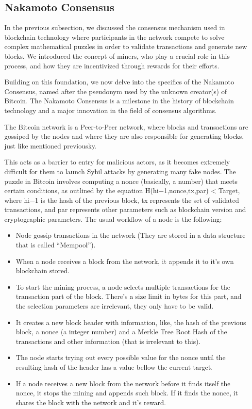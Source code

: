 \subsection*{Nakamoto Consensus}
In the previous subsection, we discussed the consensus mechanism used in blockchain technology where participants in the network compete to solve complex mathematical puzzles in order to validate transactions and generate new blocks.
We introduced the concept of miners, who play a crucial role in this process, and how they are incentivized through rewards for their efforts.

Building on this foundation, we now delve into the specifics of the Nakamoto Consensus, named after the pseudonym used by the unknown creator(s) of Bitcoin. The Nakamoto Consensus is a milestone in the history of blockchain technology and a major innovation in the field of consensus algorithms.

The Bitcoin network is a Peer-to-Peer network, where blocks and transactions are gossiped by the nodes and where they are also responsible for generating blocks, just like mentioned previousky.

This acts as a barrier to entry for malicious actors, as it becomes extremely difficult for them to launch Sybil attacks by generating many fake nodes.
The puzzle in Bitcoin involves computing a nonce (basically, a number) that meets certain conditions, as outlined by the equation H(hi−1,nonce,tx,par) < Target, where hi−1 is the hash of the previous block, tx represents the set of validated transactions, and par represents other parameters such as blockchain version and cryptographic parameters.
The usual workflow of a node is the following:
\begin{itemize}
    \item Node gossip transactions in the network (They are stored in a data structure that is called ``Mempool'').
    \item When a node receives a block from the network, it appends it to it's own blockchain stored.
    \item To start the mining process, a node selects multiple transactions for the transaction part of the block. There's a size limit in bytes for this part, and the selection parameters are irrelevant, they only have to be valid.
    \item It creates a new block header with information, like, the hash of the previous block, a nonce (a integer number) and a Merkle Tree Root Hash of the transactions and other information (that is irrelevant to this).
    \item The node starts trying out every possible value for the nonce until the resulting hash of the header has a value bellow the current target.
    \item If a node receives a new block from the network before it finds itself the nonce, it stops the mining and appends such block. If it finds the nonce, it shares the block with the network and it's reward.
    
\end{itemize}


